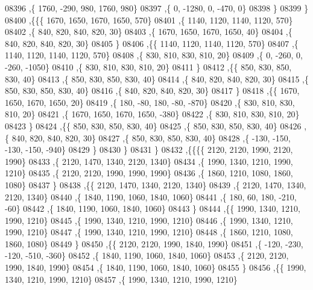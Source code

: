 \begin{DoxyCode}
08396     ,\{  1760,  -290,   980,  1760,   980\}
08397     ,\{     0, -1280,     0,  -470,     0\}
08398     \}
08399    \}
08400   ,\{\{\{  1670,  1650,  1670,  1650,   570\}
08401     ,\{  1140,  1120,  1140,  1120,   570\}
08402     ,\{   840,   820,   840,   820,    30\}
08403     ,\{  1670,  1650,  1670,  1650,    40\}
08404     ,\{   840,   820,   840,   820,    30\}
08405     \}
08406    ,\{\{  1140,  1120,  1140,  1120,   570\}
08407     ,\{  1140,  1120,  1140,  1120,   570\}
08408     ,\{   830,   810,   830,   810,    20\}
08409     ,\{     0,  -260,     0,  -260, -1050\}
08410     ,\{   830,   810,   830,   810,    20\}
08411     \}
08412    ,\{\{   850,   830,   850,   830,    40\}
08413     ,\{   850,   830,   850,   830,    40\}
08414     ,\{   840,   820,   840,   820,    30\}
08415     ,\{   850,   830,   850,   830,    40\}
08416     ,\{   840,   820,   840,   820,    30\}
08417     \}
08418    ,\{\{  1670,  1650,  1670,  1650,    20\}
08419     ,\{   180,   -80,   180,   -80,  -870\}
08420     ,\{   830,   810,   830,   810,    20\}
08421     ,\{  1670,  1650,  1670,  1650,  -380\}
08422     ,\{   830,   810,   830,   810,    20\}
08423     \}
08424    ,\{\{   850,   830,   850,   830,    40\}
08425     ,\{   850,   830,   850,   830,    40\}
08426     ,\{   840,   820,   840,   820,    30\}
08427     ,\{   850,   830,   850,   830,    40\}
08428     ,\{  -130,  -150,  -130,  -150,  -940\}
08429     \}
08430    \}
08431   \}
08432  ,\{\{\{\{  2120,  2120,  1990,  2120,  1990\}
08433     ,\{  2120,  1470,  1340,  2120,  1340\}
08434     ,\{  1990,  1340,  1210,  1990,  1210\}
08435     ,\{  2120,  2120,  1990,  1990,  1990\}
08436     ,\{  1860,  1210,  1080,  1860,  1080\}
08437     \}
08438    ,\{\{  2120,  1470,  1340,  2120,  1340\}
08439     ,\{  2120,  1470,  1340,  2120,  1340\}
08440     ,\{  1840,  1190,  1060,  1840,  1060\}
08441     ,\{   180,    60,   180,  -210,   -60\}
08442     ,\{  1840,  1190,  1060,  1840,  1060\}
08443     \}
08444    ,\{\{  1990,  1340,  1210,  1990,  1210\}
08445     ,\{  1990,  1340,  1210,  1990,  1210\}
08446     ,\{  1990,  1340,  1210,  1990,  1210\}
08447     ,\{  1990,  1340,  1210,  1990,  1210\}
08448     ,\{  1860,  1210,  1080,  1860,  1080\}
08449     \}
08450    ,\{\{  2120,  2120,  1990,  1840,  1990\}
08451     ,\{  -120,  -230,  -120,  -510,  -360\}
08452     ,\{  1840,  1190,  1060,  1840,  1060\}
08453     ,\{  2120,  2120,  1990,  1840,  1990\}
08454     ,\{  1840,  1190,  1060,  1840,  1060\}
08455     \}
08456    ,\{\{  1990,  1340,  1210,  1990,  1210\}
08457     ,\{  1990,  1340,  1210,  1990,  1210\}

\end{DoxyCode}
